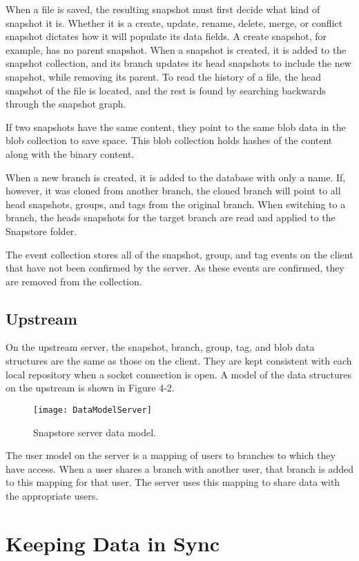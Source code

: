 When a file is saved, the resulting snapshot must first decide what kind of snapshot it is. Whether it is a create, update, rename, delete, merge, or conflict snapshot dictates how it will populate its data fields. A create snapshot, for example, has no parent snapshot. When a snapshot is created, it is added to the snapshot collection, and its branch updates its head snapshots to include the new snapshot, while removing its parent. To read the history of a file, the head snapshot of the file is located, and the rest is found by searching backwards through the snapshot graph.

If two snapshots have the same content, they point to the same blob data in the blob collection to save space. This blob collection holds hashes of the content along with the binary content.

When a new branch is created, it is added to the database with only a name. If, however, it was cloned from another branch, the cloned branch will point to all head snapshots, groups, and tags from the original branch. When switching to a branch, the heads snapshots for the target branch are read and applied to the Snapstore folder.

The event collection stores all of the snapshot, group, and tag events on the client that have not been confirmed by the server. As these events are confirmed, they are removed from the collection.

\subsection{Upstream}

On the upstream server, the snapshot, branch, group, tag, and blob data structures are the same as those on the client. They are kept consistent with each local repository when a socket connection is open. A model of the data structures on the upstream is shown in Figure 4-2.

\begin{figure}
\texttt{[image: DataModelServer]}
\caption{Snapstore server data model.}
\label{arm:fig1}
\end{figure}

The user model on the server is a mapping of users to branches to which they have access. When a user shares a branch with another user, that branch is added to this mapping for that user. The server uses this mapping to share data with the appropriate users.

\section{Keeping Data in Sync}

